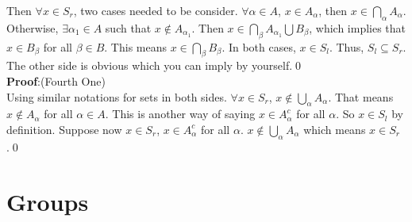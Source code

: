 \documentclass{article}
\begin{document}
Then $\forall x \in S_r$, two cases needed to be consider. $\forall \alpha \in A$, $x \in A_{\alpha}$, then
$x \in \bigcap_{\alpha} A_{\alpha}$. Otherwise, $\exists \alpha_1 \in A$ such that $x \notin A_{\alpha_1}$. Then 
$x \in \bigcap_{\beta} A_{\alpha_1} \bigcup B_{\beta}$, which implies that $x \in B_{\beta}$ for all $\beta \in B$. 
This means $x \in \bigcap_{\beta} B_{\beta}$. In both cases, $x \in S_l$. Thus, $S_l \subseteq S_r$. The other side 
is obvious which you can imply by yourself.\qed\\
\textbf{Proof}:(Fourth One)\\
Using similar notations for sets in both sides. $\forall x \in S_r$, $x \notin \bigcup_{\alpha} A_{\alpha}$. That means $x \notin A_\alpha$ for
all $\alpha \in A$. This is another way of saying $x \in A_{\alpha}^c$ for all $\alpha$. So $x \in S_l$ by definition. Suppose 
now $x \in S_r$, $x \in A_{\alpha}^c$ for all $\alpha$. $x \notin \bigcup_{\alpha} A_{\alpha}$ which means $x \in S_r$.\qed
\newpage
\section{Groups}
\end{document}
